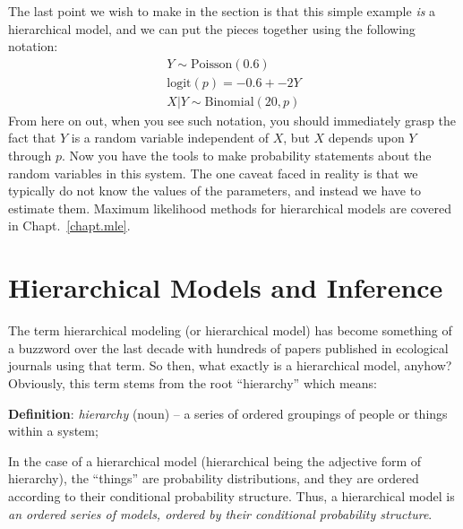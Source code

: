 The last point we wish
to make in the section is that this simple example \textit{is}
a hierarchical model, and we can put the pieces together using
the following notation:
\begin{gather}
  Y \sim \text{Poisson}(0.6) \\
  \text{logit}(p) = -0.6 + -2Y \\
  X|Y \sim \text{Binomial}(20, p)
\end{gather}
From here on out, when you see such notation, you should immediately
grasp the fact that $Y$ is a random variable independent of $X$, but
$X$ depends upon $Y$ through $p$. Now you have the tools to make
probability statements about the random variables in this system. The
one caveat faced in reality is that we typically do not know the
values of the parameters, and instead we have to estimate
them. Maximum likelihood methods for hierarchical models are covered
in Chapt.~\ref{chapt.mle}.



\section{Hierarchical Models and Inference}

The term hierarchical modeling (or hierarchical model) has become
something of a buzzword over the last decade with hundreds of papers
published in ecological journals using that term.  So then, what
exactly is a hierarchical model, anyhow? Obviously, this term stems
from the root ``hierarchy'' which means:

\vspace{.1in}

{\flushleft
{\bf Definition}: {\it hierarchy} (noun) -- a series of ordered groupings of people or things within a system;
}

\vspace{.1in}

In the case of a hierarchical model (hierarchical being the adjective
form of hierarchy), the ``things'' are probability distributions, and
they are ordered according to their conditional probability structure.
Thus, a hierarchical model is {\it an ordered series of models,
  ordered by their conditional probability structure}.

